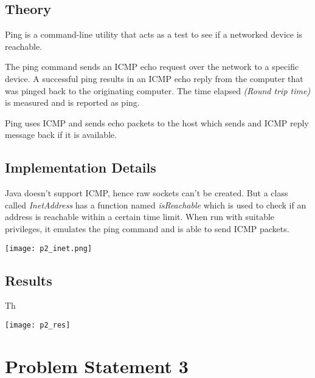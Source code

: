 \documentclass[11pt,a4paper]{article}
\begin{document}
\subsection{Theory}\label{sec:theory2}
Ping is a command-line utility that acts as a test to see if a networked device is reachable.

The ping command sends an ICMP echo request over the network to a specific device. A successful ping results in an ICMP echo reply from the computer that was pinged back to the originating computer. The time elapsed\textit{ (Round trip time)} is measured and is reported as ping.

Ping uses ICMP and sends echo packets to the host which sends and ICMP reply message back if it is available.

\subsection{Implementation Details}\label{sec:details2}
Java doesn't support ICMP, hence raw sockets can't be created. But a class called \emph{InetAddress} has a function named \textit{isReachable} which is used to check if an address is reachable within a certain time limit. When run with suitable privileges, it emulates the ping command and is able to send ICMP packets. 


\texttt{[image: p2\_inet.png]}


\subsection{Results}\label{sec:results2}
Th

\texttt{[image: p2\_res]}


\section{Problem Statement 3}\label{sec:problem3}
\end{document}
